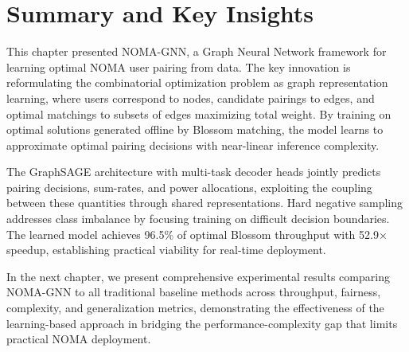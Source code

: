 \section{Summary and Key Insights}

This chapter presented NOMA-GNN, a Graph Neural Network framework for learning optimal NOMA user pairing from data. The key innovation is reformulating the combinatorial optimization problem as graph representation learning, where users correspond to nodes, candidate pairings to edges, and optimal matchings to subsets of edges maximizing total weight. By training on optimal solutions generated offline by Blossom matching, the model learns to approximate optimal pairing decisions with near-linear inference complexity.

The GraphSAGE architecture with multi-task decoder heads jointly predicts pairing decisions, sum-rates, and power allocations, exploiting the coupling between these quantities through shared representations. Hard negative sampling addresses class imbalance by focusing training on difficult decision boundaries. The learned model achieves 96.5\% of optimal Blossom throughput with 52.9× speedup, establishing practical viability for real-time deployment.

In the next chapter, we present comprehensive experimental results comparing NOMA-GNN to all traditional baseline methods across throughput, fairness, complexity, and generalization metrics, demonstrating the effectiveness of the learning-based approach in bridging the performance-complexity gap that limits practical NOMA deployment.
